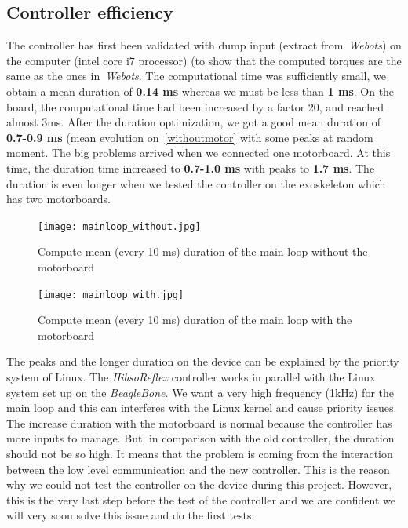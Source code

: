 \documentclass[a4paper,12pt]{article}
\begin{document}
\subsection{Controller efficiency}

The controller has first been validated with dump input (extract from~\textit{Webots}) on the computer (intel core i7 processor) (to show that the computed torques are the same as the ones in~\textit{Webots}. The computational time was sufficiently small, we obtain a mean duration of \textbf{0.14 ms} whereas we must be less than \textbf{1 ms}.
\medbreak
On the board, the computational time had been increased by a factor 20, and reached almost 3ms. After the duration optimization, we got a good mean duration of \textbf{0.7-0.9 ms} (mean evolution on~\ref{withoutmotor} with some peaks at random moment.
The big problems arrived when we connected one motorboard. At this time, the duration time increased to \textbf{0.7-1.0 ms} with peaks to \textbf{1.7 ms}. The duration is even longer when we tested the controller on the exoskeleton which has two motorboards.

\begin{figure}[H]
\begin{minipage}[c]{.45\linewidth}
     \begin{center}
             \texttt{[image: mainloop\_without.jpg]}
             \label{withoutmotor}
             \caption{Compute mean (every 10 ms) duration of the main loop without the motorboard}
         \end{center}
         
   \end{minipage} \hfill
   \begin{minipage}[c]{.45\linewidth}
    \begin{center}
            \texttt{[image: mainloop\_with.jpg]}
            \label{withmotor}
            \caption{Compute mean (every 10 ms) duration of the main loop with the motorboard}
        \end{center}
 \end{minipage}
\end{figure}

The peaks and the longer duration on the device can be explained by the priority system of Linux. The \textit{HibsoReflex} controller works in parallel with the Linux system set up on the \textit{BeagleBone}. We want a very high frequency (1kHz) for the main loop and this can interferes with the Linux kernel and cause priority issues. \\
The increase duration with the motorboard is normal because the controller has more inputs to manage. But, in comparison with the old controller, the duration should not be so high. It means that the problem is coming from the interaction between the low level communication and the new controller. This is the reason why we could not test the controller on the device during this project. However, this is the very last step before the test of the controller and we are confident we will very soon solve this issue and do the first tests.
\end{document}
